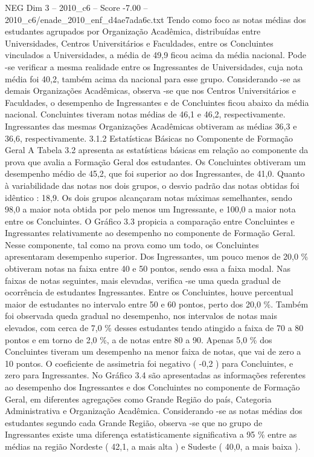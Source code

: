 \begin{textsample}{NEG Dim 3 – 2010\_c6 – Score -7.00 – 2010\_c6/enade\_2010\_enf\_d4ae7ada6c.txt}
Tendo como foco as notas médias dos estudantes agrupados por Organização Acadêmica, distribuídas entre Universidades, Centros Universitários e Faculdades, entre os Concluintes vinculados a Universidades, a média de 49,9 ficou acima da média nacional.
Pode -se verificar a mesma realidade entre os Ingressantes de Universidades, cuja nota média foi 40,2, também acima da nacional para esse grupo.
Considerando -se as demais Organizações Acadêmicas, observa -se que nos Centros Universitários e Faculdades, o desempenho de Ingressantes e de Concluintes ficou abaixo da média nacional.
Concluintes tiveram notas médias de 46,1 e 46,2, respectivamente.
Ingressantes das mesmas Organizações Acadêmicas obtiveram as médias 36,3 e 36,6, respectivamente. 3.1.2 Estatísticas Básicas no Componente de Formação Geral A Tabela 3.2 apresenta as estatísticas básicas em relação ao componente da prova que avalia a Formação Geral dos estudantes.
Os Concluintes obtiveram um desempenho médio de 45,2, que foi superior ao dos Ingressantes, de 41,0.
Quanto à variabilidade das notas nos dois grupos, o desvio padrão das notas obtidas foi idêntico : 18,9.
Os dois grupos alcançaram notas máximas semelhantes, sendo 98,0 a maior nota obtida por pelo menos um Ingressante, e 100,0 a maior nota entre os Concluintes.
O Gráfico 3.3 propicia a comparação entre Concluintes e Ingressantes relativamente ao desempenho no componente de Formação Geral.
Nesse componente, tal como na prova como um todo, os Concluintes apresentaram desempenho superior.
Dos Ingressantes, um pouco menos de 20,0 \% obtiveram notas na faixa entre 40 e 50 pontos, sendo essa a faixa modal.
Nas faixas de notas seguintes, mais elevadas, verifica -se uma queda gradual de ocorrência de estudantes Ingressantes.
Entre os Concluintes, houve percentual maior de estudantes no intervalo entre 50 e 60 pontos, perto dos 20,0 \%.
Também foi observada queda gradual no desempenho, nos intervalos de notas mais elevados, com cerca de 7,0 \% desses estudantes tendo atingido a faixa de 70 a 80 pontos e em torno de 2,0 \%, a de notas entre 80 a 90.
Apenas 5,0 \% dos Concluintes tiveram um desempenho na menor faixa de notas, que vai de zero a 10 pontos.
O coeficiente de assimetria foi negativo ( -0,2 ) para Concluintes, e zero para Ingressantes.
No Gráfico 3.4 são apresentadas as informações referentes ao desempenho dos Ingressantes e dos Concluintes no componente de Formação Geral, em diferentes agregações como Grande Região do país, Categoria Administrativa e Organização Acadêmica.
Considerando -se as notas médias dos estudantes segundo cada Grande Região, observa -se que no grupo de Ingressantes existe uma diferença estatisticamente significativa a 95 \% entre as médias na região Nordeste ( 42,1, a mais alta ) e Sudeste ( 40,0, a mais baixa ).

\end{textsample}
